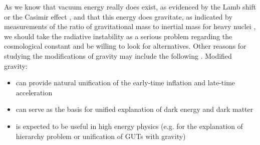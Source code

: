 As we know that vacuum energy really does exist, as evidenced by the Lamb shift \parencite{2020Physi...2..105M} or the Casimir effect \parencite{2006BrJPh..36.1137F}, and that this energy does gravitate, as indicated by measurements of the ratio of gravitational mass to inertial mass for heavy nuclei \parencite{Braginskii:1971tn}, we should take the radiative instability as a serious problem regarding the cosmological constant and be willing to look for alternatives. Other reasons for studying the modifications of gravity may include the following \parencite{2006hep.th....1213N}. Modified gravity:
\begin{itemize}
	\item can provide natural unification of the early-time inflation and late-time acceleration
	\item can serve as the basis for unified explanation of dark energy and dark matter
	\item is expected to be useful in high energy physics (e.g. for the explanation of hierarchy problem or unification of GUTs with gravity)
\end{itemize}